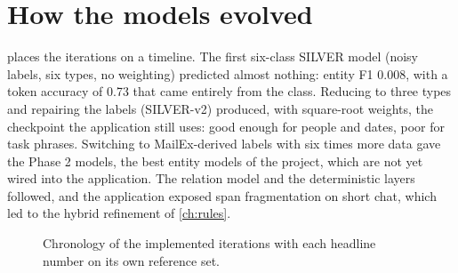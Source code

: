 \section{How the models evolved}
 places the iterations on a timeline. The first six-class SILVER model (noisy labels, six types, no weighting) predicted almost nothing: entity F1 0.008, with a token accuracy of 0.73 that came entirely from the  class. Reducing to three types and repairing the labels (SILVER-v2) produced, with square-root weights, the checkpoint the application still uses: good enough for people and dates, poor for task phrases. Switching to MailEx-derived labels with six times more data gave the Phase 2 models, the best entity models of the project, which are not yet wired into the application. The relation model and the deterministic layers followed, and the application exposed span fragmentation on short chat, which led to the hybrid refinement of \cref{ch:rules}.

\begin{figure}[htbp]
\centering
{}
\caption{Chronology of the implemented iterations with each headline number on its own reference set.}
\label{fig:evolution}
\end{figure}
